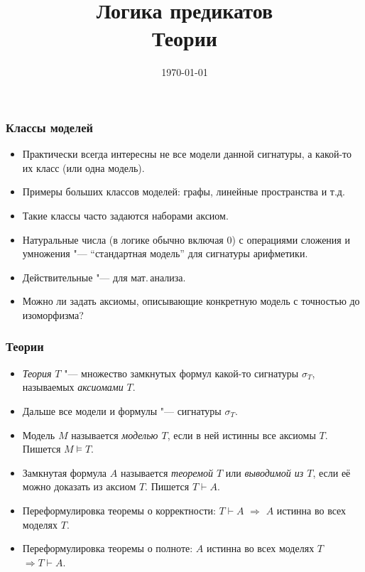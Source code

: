 \documentclass[10pt]{beamer}
\title{Логика предикатов\\Теории}
\date{\today}
\begin{document}
\begin{frame}[plain]
\maketitle
\end{frame}

\begin{frame}
\frametitle{Классы моделей}
\begin{itemize}
    \item Практически всегда интересны не все модели данной сигнатуры, а какой-то их класс (или одна модель).
    \item Примеры больших классов моделей: графы, линейные пространства и т.д.
    \item Такие классы часто задаются наборами аксиом.
    \item Натуральные числа (в логике обычно включая $0$) с операциями сложения и умножения "--- \enquote{стандартная модель} для сигнатуры арифметики.
    \item Действительные "--- для мат.\,анализа.
    \item Можно ли задать аксиомы, описывающие конкретную модель с точностью до изоморфизма?
\end{itemize}
\end{frame}

\begin{frame}
    \frametitle{Теории}
    \begin{itemize}
        \item \emph{Теория} $T$ "--- множество замкнутых формул какой-то сигнатуры $\sigma_T$, называемых \emph{аксиомами} $T$. 
        \item Дальше все модели и формулы "--- сигнатуры $\sigma_T$.
        \pause
        \item Модель $M$ называется \emph{моделью $T$}, если в ней истинны все аксиомы $T$. Пишется $M \vDash T$.
        \pause
        \item Замкнутая формула $A$ называется \emph{теоремой $T$} или \emph{выводимой из $T$}, если её можно доказать из аксиом $T$. Пишется $T \vdash A$.
        \pause
        \item Переформулировка теоремы о корректности: $T \vdash A$ $\Rightarrow$ $A$ истинна во всех моделях $T$.
        \item Переформулировка теоремы о полноте: $A$ истинна во всех моделях $T$ $\Rightarrow T \vdash A$.
    \end{itemize}
\end{frame}
\end{document}
